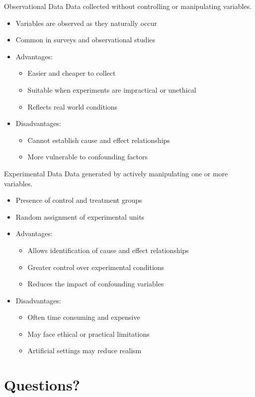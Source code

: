 \documentclass[12pt, aspectratio=169]{beamer}
\begin{document}
	\begin{frame}{Observational Data}
		Data collected without controlling or manipulating variables.
		\begin{itemize}
			\item Variables are observed as they naturally occur
			\item Common in surveys and observational studies
			\item Advantages:
			\begin{itemize}
				\item Easier and cheaper to collect
				\item Suitable when experiments are impractical or unethical
				\item Reflects real world conditions
			\end{itemize}
			\item Disadvantages:
			\begin{itemize}
				\item Cannot establish cause and effect relationships
				\item More vulnerable to confounding factors
			\end{itemize}
		\end{itemize}
	\end{frame}


	\begin{frame}{Experimental Data}
		Data generated by actively manipulating one or more variables.
		\begin{itemize}
			\item Presence of control and treatment groups
			\item Random assignment of experimental units
			\item Advantages:
			\begin{itemize}
				\item Allows identification of cause and effect relationships
				\item Greater control over experimental conditions
				\item Reduces the impact of confounding variables
			\end{itemize}
			\item Disadvantages:
			\begin{itemize}
				\item Often time consuming and expensive
				\item May face ethical or practical limitations
				\item Artificial settings may reduce realism
			\end{itemize}
		\end{itemize}
	\end{frame}



	\section*{Questions?}
\end{document}
